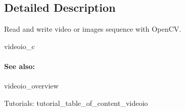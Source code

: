 \subsection{Detailed Description}
Read and write video or images sequence with Open\+CV. 

videoio\+\_\+c

\paragraph*{See also\+:}


\begin{DoxyItemize}
\item videoio\+\_\+overview
\item Tutorials\+: tutorial\+\_\+table\+\_\+of\+\_\+content\+\_\+videoio
\end{DoxyItemize}